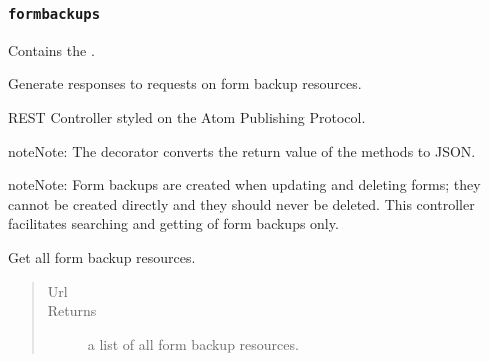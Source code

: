 \documentclass[letterpaper,10pt,english]{sphinxmanual}
\begin{document}
\subsubsection{\texttt{formbackups}}
\label{api:formbackups}\label{api:module-onlinelinguisticdatabase.controllers.formbackups}
Contains the {\hyperref[api:onlinelinguisticdatabase.controllers.formbackups.FormbackupsController]{}}.
\label{api:module-formbackups}

\begin{fulllineitems}
\label{api:onlinelinguisticdatabase.controllers.formbackups.FormbackupsController}
Generate responses to requests on form backup resources.

REST Controller styled on the Atom Publishing Protocol.

\begin{notice}{note}{Note:}
The  decorator converts the return value of the methods to
JSON.
\end{notice}

\begin{notice}{note}{Note:}
Form backups are created when updating and deleting forms; they cannot
be created directly and they should never be deleted.  This controller
facilitates searching and getting of form backups only.
\end{notice}

\begin{fulllineitems}
\label{api:onlinelinguisticdatabase.controllers.formbackups.FormbackupsController.index}
Get all form backup resources.
\begin{quote}\begin{description}
\item[{Url }] \leavevmode
{}

\item[{Returns}] \leavevmode
a list of all form backup resources.

\end{description}\end{quote}


\end{fulllineitems}
\end{fulllineitems}
\end{document}
